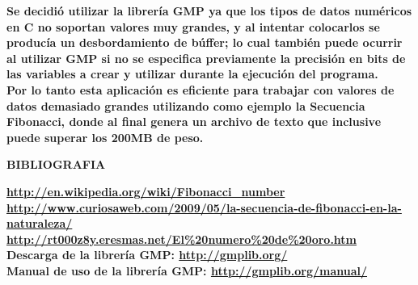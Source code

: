 \documentclass[letterpaper]{article}
\begin{document}
\begin{flushleft}
\textbf{\Large Se decidi\'o utilizar la librer\'ia GMP ya que los tipos de datos num\'ericos en C no soportan valores muy grandes, y al intentar colocarlos se produc\'ia un desbordamiento de b\'uffer; lo cual tambi\'en puede ocurrir al utilizar GMP si no se especifica previamente la precisi\'on en bits de las variables a crear y utilizar durante la ejecuci\'on del programa.\\}
\vspace{0.5cm}
\textbf{\Large Por lo tanto esta aplicaci\'on es eficiente para trabajar con valores de datos demasiado grandes utilizando como ejemplo la Secuencia Fibonacci, donde al final genera un archivo de texto que inclusive puede superar los 200MB de peso.\\}
\vspace{1.0cm}
\end{flushleft}

\begin{center}
\textbf{\LARGE BIBLIOGRAFIA\\}
\vspace{1.0cm}
\end{center}

\begin{flushleft}
\textbf{\large \url{http://en.wikipedia.org/wiki/Fibonacci_number}\\}
\vspace{0.5cm}
\textbf{\large \url{http://www.curiosaweb.com/2009/05/la-secuencia-de-fibonacci-en-la-naturaleza/}\\}
\vspace{0.5cm}
\textbf{\large \url{http://rt000z8y.eresmas.net/El\%20numero\%20de\%20oro.htm}\\}
\vspace{0.5cm}
\textbf{\large Descarga de la librer\'ia GMP: \url{http://gmplib.org/}\\}
\vspace{0.5cm}
\textbf{\large Manual de uso de la librer\'ia GMP: \url{http://gmplib.org/manual/}\\}
\end{flushleft}

\clearpage

\thispagestyle{empty}
\end{document}
